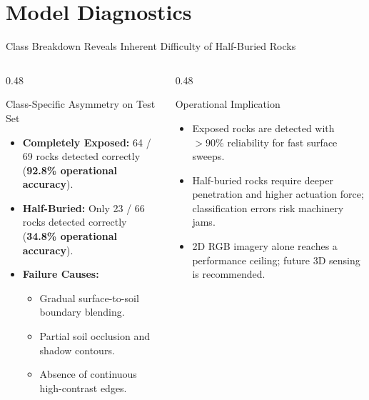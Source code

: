 \documentclass[aspectratio=169,10pt]{beamer}
\begin{document}
\section{Model Diagnostics}
\begin{frame}{Class Breakdown Reveals Inherent Difficulty of Half-Buried Rocks}
\begin{columns}[T]
  \begin{column}{0.48\textwidth}
    \begin{block}{\small Class-Specific Asymmetry on Test Set}
      \small
      \begin{itemize}
        \item \textbf{Completely Exposed:} 64 / 69 rocks detected correctly (\textbf{92.8\% operational accuracy}).
        \item \textbf{Half-Buried:} Only 23 / 66 rocks detected correctly (\textbf{34.8\% operational accuracy}).
        \item \textbf{Failure Causes:}
        \begin{itemize}
          \item Gradual surface-to-soil boundary blending.
          \item Partial soil occlusion and shadow contours.
          \item Absence of continuous high-contrast edges.
        \end{itemize}
      \end{itemize}
    \end{block}
  \end{column}
  \begin{column}{0.48\textwidth}
    \begin{block}{\small Operational Implication}
      \small
      \begin{itemize}
        \item Exposed rocks are detected with $>90\%$ reliability for fast surface sweeps.
        \item Half-buried rocks require deeper penetration and higher actuation force; classification errors risk machinery jams.
        \item 2D RGB imagery alone reaches a performance ceiling; future 3D sensing is recommended.
      \end{itemize}
    \end{block}
  \end{column}
\end{columns}
\end{frame}
\end{document}
